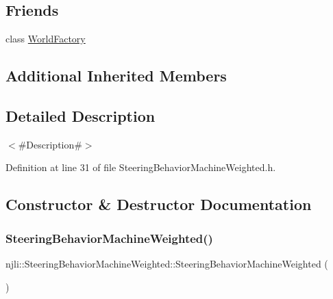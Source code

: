\subsection*{Friends}
\begin{DoxyCompactItemize}
\item 
class \mbox{\hyperlink{classnjli_1_1_steering_behavior_machine_weighted_acb96ebb09abe8f2a37a915a842babfac}{World\+Factory}}
\end{DoxyCompactItemize}
\subsection*{Additional Inherited Members}


\subsection{Detailed Description}
$<$\#\+Description\#$>$ 

Definition at line 31 of file Steering\+Behavior\+Machine\+Weighted.\+h.



\subsection{Constructor \& Destructor Documentation}
\mbox{\label{classnjli_1_1_steering_behavior_machine_weighted_ac119f176d0a5f0d95253f2e192ac847b}} 
\subsubsection{\texorpdfstring{Steering\+Behavior\+Machine\+Weighted()}{SteeringBehaviorMachineWeighted()}\hspace{0.1cm}{\footnotesize\ttfamily [1/3]}}
{\footnotesize\ttfamily njli\+::\+Steering\+Behavior\+Machine\+Weighted\+::\+Steering\+Behavior\+Machine\+Weighted (\begin{DoxyParamCaption}{ }\end{DoxyParamCaption})\hspace{0.3cm}{\ttfamily [protected]}}

